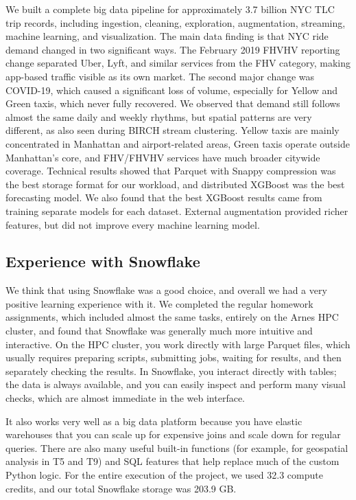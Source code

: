 \documentclass[fleqn,moreauthors,9pt]{ds_report}
\begin{document}
We built a complete big data pipeline for approximately 3.7 billion NYC TLC trip records, including ingestion, cleaning, exploration, augmentation, streaming, machine learning, and visualization. The main data finding is that NYC ride demand changed in two significant ways. The February 2019 FHVHV reporting change separated Uber, Lyft, and similar services from the FHV category, making app-based traffic visible as its own market. The second major change was COVID-19, which caused a significant loss of volume, especially for Yellow and Green taxis, which never fully recovered. We observed that demand still follows almost the same daily and weekly rhythms, but spatial patterns are very different, as also seen during BIRCH stream clustering. Yellow taxis are mainly concentrated in Manhattan and airport-related areas, Green taxis operate outside Manhattan's core, and FHV/FHVHV services have much broader citywide coverage. Technical results showed that Parquet with Snappy compression was the best storage format for our workload, and distributed XGBoost was the best forecasting model. We also found that the best XGBoost results came from training separate models for each dataset. External augmentation provided richer features, but did not improve every machine learning model.

\subsection*{Experience with Snowflake}

We think that using Snowflake was a good choice, and overall we had a very positive learning experience with it. We completed the regular homework assignments, which included almost the same tasks, entirely on the Arnes HPC cluster, and found that Snowflake was generally much more intuitive and interactive. On the HPC cluster, you work directly with large Parquet files, which usually requires preparing scripts, submitting jobs, waiting for results, and then separately checking the results. In Snowflake, you interact directly with tables; the data is always available, and you can easily inspect and perform many visual checks, which are almost immediate in the web interface.

It also works very well as a big data platform because you have elastic warehouses that you can scale up for expensive joins and scale down for regular queries. There are also many useful built-in functions (for example, for geospatial analysis in T5 and T9) and SQL features that help replace much of the custom Python logic. For the entire execution of the project, we used 32.3 compute credits, and our total Snowflake storage was 203.9 GB.
\end{document}
